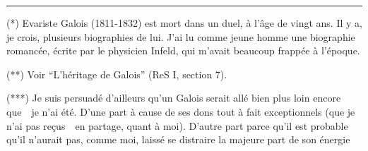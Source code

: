 \medskip\noindent\rule{0.15\linewidth}{0.45pt}

\noindent (*) Evariste Galois (1811-1832) est mort dans un duel, à l'âge de vingt ans. Il y a, je crois, plusieurs biographies de lui. J'ai lu comme jeune homme une biographie romancée, écrite par le physicien Infeld, qui m'avait beaucoup frappée à l'époque.

\noindent (**) Voir ``L'héritage de Galois'' (ReS I, section 7).

\noindent (***) Je suis persuadé d'ailleurs qu'un Galois serait allé bien plus loin encore que\ \ je n'ai été. D'une part à cause de ses dons tout à fait exceptionnels (que je n'ai pas reçus\ \ en partage, quant à moi). D'autre part parce qu'il est probable qu'il n'aurait pas, comme moi, laissé se distraire la majeure part de son énergie


